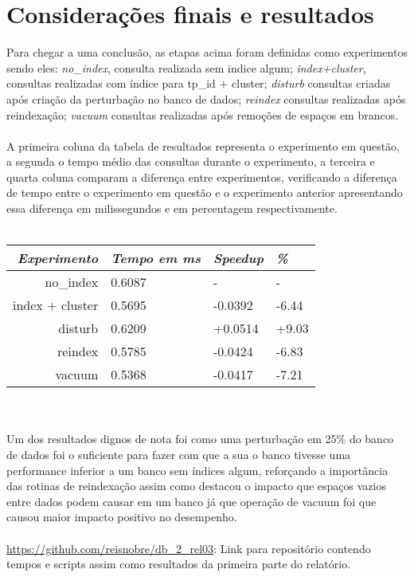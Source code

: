 \documentclass[12pt, a4paper, twoside, titlepage]{article}
\begin{document}
\section{Considerações finais e resultados} \label{documentclasses}
Para chegar a uma conclusão, as etapas acima foram definidas como experimentos sendo eles:
\textit{no\_index}, consulta realizada sem indice algum; \textit{index+cluster}, consultas realizadas com índice para tp\_id + cluster; \textit{disturb} consultas criadas após criação da perturbação no banco de dados; \textit{reindex} consultas realizadas após reindexação; \textit{vacuum} consultas realizadas após remoções de espaços em brancos.
\\\\A primeira coluna da tabela de resultados representa o experimento em questão, a segunda o tempo médio das consultas durante o experimento, a terceira e quarta coluna comparam a diferença entre experimentos, verificando a diferença de tempo entre o experimento em questão e o experimento anterior apresentando essa diferença em milissegundos e em percentagem respectivamente.
\\\\
\begin{tabular}{r | m | l | p}
	\textit{Experimento} & \textit{Tempo em ms} & \textit{Speedup} & \textit{\%}\\
	\hline
	no\_index & 0.6087 & - & - \\
	index + cluster 	& 0.5695 & -0.0392 & -6.44\\
	disturb 			& 0.6209 & +0.0514 & +9.03 \\
	reindex 			& 0.5785 & -0.0424 & -6.83 \\
	vacuum 				& 0.5368 & -0.0417 & -7.21\\
\end{tabular}
\\\\Um dos resultados dignos de nota foi como uma perturbação em 25\% do banco de dados foi o suficiente para fazer com que a sua o banco tivesse uma performance inferior a um banco sem índices algum, reforçando a importância das rotinas de reindexação assim como destacou o impacto que espaços vazios entre dados podem causar em um banco já que operação de vacuum foi que causou maior impacto positivo no desempenho.
\\\\\url{https://github.com/reisnobre/db\_2\_rel03}: Link para repositório contendo tempos e scripts assim como resultados da primeira parte do relatório.
\end{document}
